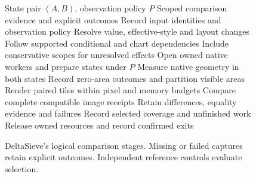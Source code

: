 \begin{figure}[t]
\footnotesize
\begin{algorithmic}[1]
\Require State pair $(A,B)$, observation policy $P$
\Ensure Scoped comparison evidence and explicit outcomes
\State Record input identities and observation policy
\State Resolve value, effective-style and layout changes
\State Follow supported conditional and chart dependencies
\State Include conservative scopes for unresolved effects
\State Open owned native workers and prepare states under $P$
  \State Measure native geometry in both states
  \State Record zero-area outcomes and partition visible areas
  \State Render paired tiles within pixel and memory budgets
  \State Compare complete compatible image receipts
  \State Retain differences, equality evidence and failures
\EndFor
\State Record selected coverage and unfinished work
\State Release owned resources and record confirmed exits
\end{algorithmic}
\caption{DeltaSieve's logical comparison stages. Missing or failed captures
retain explicit outcomes. Independent reference controls evaluate selection.}
\label{fig:comparison-algorithm}
\end{figure}
